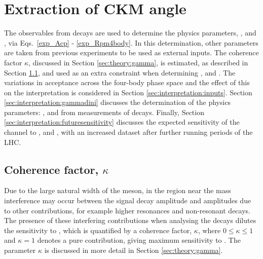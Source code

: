 \clearpage
%

\chapter{\label{ch:6-interpretation}Extraction of CKM angle \Pgamma} 

\minitoc

The \CP observables from \btodkst decays are used to determine the physics parameters, \rb, \deltab and \Pgamma, via Eqs.~\ref{exp_Acp} - \ref{exp_Rpm4body}. In this determination, other parameters are taken from previous experiments to be used as external inputs. The coherence factor $\kappa$, discussed in Section \ref{sec:theory:gamma}, is estimated, as described in Section \ref{sec:interpretation:coherence}, and used as an extra constraint when determining \rb, \deltab and \Pgamma. The variations in acceptance across the four-body phase space and the effect of this on the interpretation is considered in Section \ref{sec:interpretation:inputs}. Section \ref{sec:interpretation:gammadini} discusses the determination of the physics parameters: \rb, \deltab and \Pgamma from measurements of \btodkst decays. Finally, Section \ref{sec:interpretation:futuresensitivity} discusses the expected sensitivity of the \btodkst channel to \rb, \deltab and \Pgamma, with an increased dataset after further running periods of the LHC.

\section{Coherence factor, $\kappa$}
\label{sec:interpretation:coherence}

Due to the large natural width of the \Kstarm meson, in the region near the \Kstarm mass interference may occur between the signal \Kstarm decay amplitude and amplitudes due to other \decay{\Bm}{\D\KS\pim} contributions, for example higher \KS\pim resonances and non-resonant decays. The presence of these interfering contributions when analysing the \btodkst decays dilutes the sensitivity to \Pgamma, which is quantified by a coherence factor, $\kappa$, where $0 \leq \kappa \leq 1$ and $\kappa = 1$ denotes a pure \Kstarm contribution, giving maximum sensitivity to \Pgamma. The parameter $\kappa$ is discussed in more detail in Section \ref{sec:theory:gamma}. 

